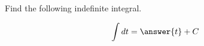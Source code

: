 \documentclass{ximera}
\author{Gregory Hartman \and Matthew Carr\and Nela Lakos}
\begin{document}
\begin{exercise}


Find the following indefinite integral.

\[
\int dt=\answer{t}+C
\]


\end{exercise}
\end{document}
